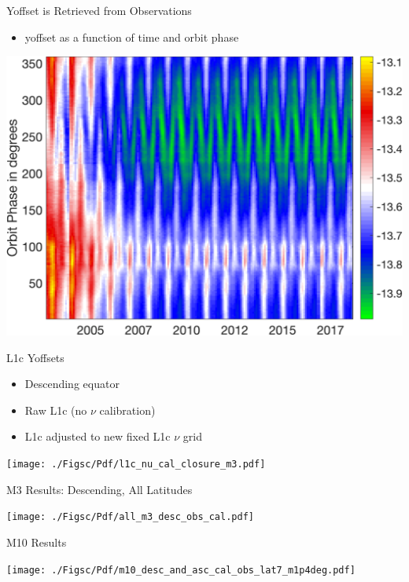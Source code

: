 \documentclass[10pt,t]{beamer}
\begin{document}
\begin{frame}[label={sec:org7417adb}]{Yoffset is Retrieved from Observations}
\begin{itemize}
\item yoffset as a function of time and orbit phase
\end{itemize}

\begin{center}
\includegraphics[width=0.8\linewidth]{./Figs/Png/offset_time_phase_pcolor.png}
\end{center}
\end{frame}

\begin{frame}[label={sec:org0a50681}]{L1c Yoffsets}
\begin{itemize}
\item Descending equator
\item Raw L1c (no \(\nu\) calibration)
\item L1c adjusted to new fixed L1c \(\nu\) grid
\end{itemize}

\begin{center}
\texttt{[image: ./Figsc/Pdf/l1c\_nu\_cal\_closure\_m3.pdf]}
\end{center}
\end{frame}

\begin{frame}[label={sec:orgdef5d0f}]{M3 Results: Descending, All Latitudes}
\begin{center}
\texttt{[image: ./Figsc/Pdf/all\_m3\_desc\_obs\_cal.pdf]}
\end{center}
\end{frame}

\begin{frame}[label={sec:orgee3f6a8}]{M10 Results}
\begin{center}
\texttt{[image: ./Figsc/Pdf/m10\_desc\_and\_asc\_cal\_obs\_lat7\_m1p4deg.pdf]}
\end{center}
\end{frame}
\end{document}

